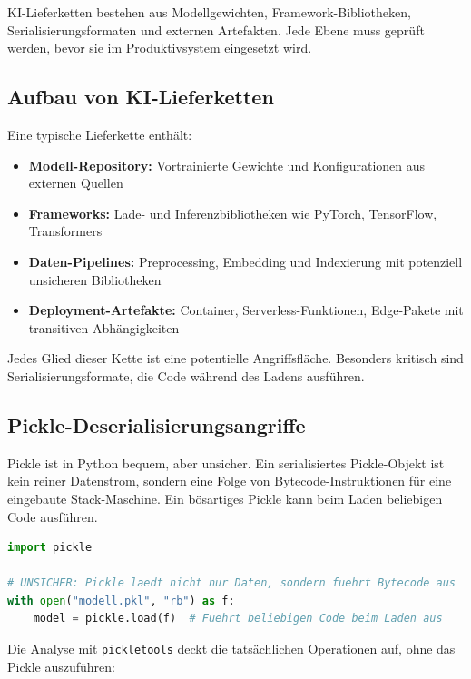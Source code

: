 KI-Lieferketten bestehen aus Modellgewichten, Framework-Bibliotheken, Serialisierungsformaten und externen Artefakten. Jede Ebene muss geprüft werden, bevor sie im Produktivsystem eingesetzt wird.

\subsection{Aufbau von KI-Lieferketten}

Eine typische Lieferkette enthält:

\begin{itemize}[leftmargin=*]
    \item \textbf{Modell-Repository:} Vortrainierte Gewichte und Konfigurationen aus externen Quellen
    \item \textbf{Frameworks:} Lade- und Inferenzbibliotheken wie PyTorch, TensorFlow, Transformers
    \item \textbf{Daten-Pipelines:} Preprocessing, Embedding und Indexierung mit potenziell unsicheren Bibliotheken
    \item \textbf{Deployment-Artefakte:} Container, Serverless-Funktionen, Edge-Pakete mit transitiven Abhängigkeiten
\end{itemize}

Jedes Glied dieser Kette ist eine potentielle Angriffsfläche. Besonders kritisch sind Serialisierungsformate, die Code während des Ladens ausführen.

\subsection{Pickle-Deserialisierungsangriffe}

Pickle ist in Python bequem, aber unsicher. Ein serialisiertes Pickle-Objekt ist kein reiner Datenstrom, sondern eine Folge von Bytecode-Instruktionen für eine eingebaute Stack-Maschine. Ein bösartiges Pickle kann beim Laden beliebigen Code ausführen.

\begin{lstlisting}[language=Python, caption=Pickle-Deserialisierung: Das grundlegende Risiko verstehen]
import pickle

# UNSICHER: Pickle laedt nicht nur Daten, sondern fuehrt Bytecode aus
with open("modell.pkl", "rb") as f:
    model = pickle.load(f)  # Fuehrt beliebigen Code beim Laden aus
\end{lstlisting}

Die Analyse mit \texttt{pickletools} deckt die tatsächlichen Operationen auf, ohne das Pickle auszuführen:


